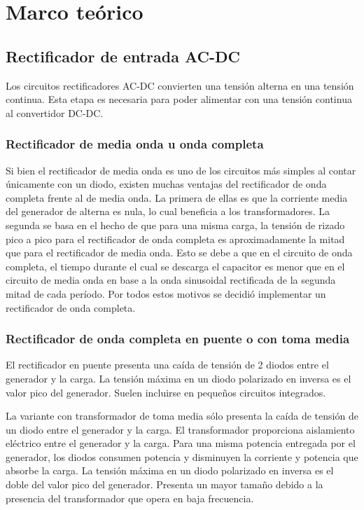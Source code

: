\section{Marco teórico}




\subsection{Rectificador de entrada AC-DC}

Los circuitos rectificadores AC-DC convierten una tensión alterna en una tensión continua.
Esta etapa es necesaria para poder alimentar con una tensión continua al convertidor DC-DC.

\subsubsection{Rectificador de media onda u onda completa}

Si bien el rectificador de media onda es uno de los circuitos más simples al contar únicamente con un diodo,
existen muchas ventajas del rectificador de onda completa frente al de media onda.
La primera de ellas es que la corriente media del generador de alterna es nula, lo cual beneficia a los transformadores. 
La segunda se basa en el hecho de que para una misma carga,
la tensión de rizado pico a pico para el rectificador de onda completa es
aproximadamente la mitad que para el rectificador de media onda. 
Esto se debe a que en el circuito de onda completa,
el tiempo durante el cual se descarga el capacitor es menor que en el circuito de media onda %
en base a la onda sinusoidal rectificada de la segunda mitad de cada período. 
Por todos estos motivos se decidió implementar un rectificador de onda completa.

\subsubsection{Rectificador de onda completa en puente o con toma media}

El rectificador en puente presenta una caída de tensión de 2 diodos entre el generador y la carga. 
La tensión máxima en un diodo polarizado en inversa es el valor pico del generador.
Suelen incluirse en pequeños circuitos integrados. 

La variante con transformador de toma media sólo presenta la caída de tensión de un diodo entre el generador y la carga.
El transformador proporciona aislamiento eléctrico entre el generador y la carga. 
Para una misma potencia entregada por el generador,
los diodos consumen potencia y disminuyen la corriente y potencia que absorbe la carga. 
La tensión máxima en un diodo polarizado en inversa es el doble del valor pico del generador. 
Presenta un mayor tamaño debido a la presencia del transformador que opera en baja frecuencia. 

